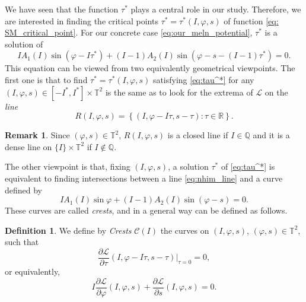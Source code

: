 \documentclass[a4paper,10pt]{article}
\newcommand{\NH}{\text{NHIM}}
\theoremstyle{definition}
\newtheorem{remark}[theorem]{Remark}
\newtheorem{definition}[theorem]{Definition}
\begin{document}
We have seen that the function $\tau^*$ plays a central role in our study.
Therefore, we are interested in finding the critical points $\tau^* = \tau^*(I,\varphi,s) $ of function \eqref{eq: SM_critical_point}.
For our concrete case \eqref{eq:our_meln_potential}, $\tau^*$ is a solution of
\begin{equation}
 I A_{1}(I)\sin(\varphi - I\tau^*) + (I-1)A_{2}(I)\sin(\varphi - s - (I-1)\tau^*)=0.\label{eq:tau^*}
\end{equation}
This equation can be viewed from two equivalently geometrical viewpoints.
The first one is that to find $\tau^* = \tau^*(I,\varphi,s)$ satisfying \eqref{eq:tau^*} for any $(I,\varphi,s)\in \left[-I^* , I^* \right]\times\mathbb{T}^2$ is the same as to look for the extrema of $\mathcal{L}$ on  the \emph{{\NH} line}
\begin{equation}
R(I,\varphi,s) = \left\{(I,\varphi - I\tau , s-\tau) : \tau \in \mathbb{R}\right\}.\label{eq:nhim_line}
\end{equation}
\begin{remark}
Since $(\varphi,s)\in\mathbb{T}^2$, $R(I,\varphi,s)$ is a closed line if $I \in \mathbb{Q}$ and it is a dense line on
$\{I\}\times\mathbb{T}^2$ if $I \notin \mathbb{Q}$.
\end{remark}
The other viewpoint is that, fixing $(I,\varphi,s)$, a solution $\tau^*$ of \eqref{eq:tau^*} is equivalent to finding intersections between a {\NH} line \eqref{eq:nhim_line} and a curve defined by
\begin{equation}
IA_1( I ) \sin\varphi + (I - 1)A_2(I)\sin(\varphi - s) = 0.\label{eq:def_crests_2}
\end{equation}
These curves are called \emph{crests}, and in a general way can be defined as follows.

\begin{definition}\label{def:crest}
\cite{Delshams2011} We define by \emph{Crests} $\mathcal{C}(I)$ the curves on $(I,\varphi,s)$, $(\varphi,s)\in \mathbb{T}^2$, such that
\begin{equation}
\frac{\partial \mathcal{L}}{\partial \tau}(I , \varphi - I \tau ,s - \tau)|_{\tau = 0} = 0,\label{eq:def_crests}
\end{equation}
or equivalently,
$$I\frac{\partial \mathcal{L}}{\partial\varphi}(I,\varphi,s) + \frac{\partial\mathcal{L}}{\partial s}(I,\varphi,s)= 0.$$
\end{definition}
\end{document}
